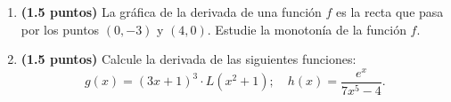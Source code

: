 
\begin{enumerate}[label=\alph*)]
\item \textbf{(1.5 puntos)} La gráfica de la derivada de una función $f$ es la recta que pasa por los puntos $(0,-3)$ y $(4,0)$. Estudie la monotonía de la función $f$.
\item \textbf{(1.5 puntos)} Calcule la derivada de las siguientes funciones:
\[
g(x)=(3x+1)^3\cdot L(x^2+1);\quad h(x)=\frac{e^x}{7x^5-4}.
\]
\end{enumerate}
